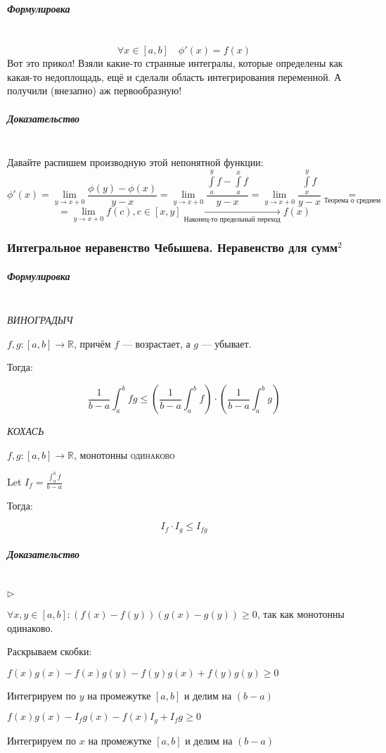 \documentclass{article}
\let\vanillasubparagraph\subparagraph
\renewcommand{\subparagraph}[1]{\vanillasubparagraph{#1}\mbox{}\\}
\begin{document}
\subparagraph{Формулировка}
$$
\forall x\in [a, b] \quad \phi'(x) = f(x)
$$
Вот это прикол! Взяли какие-то странные интегралы, которые определены как какая-то недоплощадь, ещё и сделали область интегрирования переменной. А получили (внезапно) аж первообразную! 

\subparagraph{Доказательство}

Давайте распишем производную этой непонятной функции:
$$
\phi'(x) = \lim_{y\rightarrow x+0}\frac{\phi(y)-\phi(x)}{y-x} = \lim_{y\rightarrow x+0}\frac{\int\limits_a^y f - \int\limits_a^x f}{y-x} = \lim_{y\rightarrow x+0}\frac{\int\limits_x^y f}{y-x} \underset{\text{Теорема о среднем}}{=}
$$
$$
=\lim_{y\rightarrow x+0}f(c), c \in [x, y] \underset{\text{Наконец-то предельный переход}}{\longrightarrow} f(x)
$$

\subsubsection{Интегральное неравенство Чебышева. Неравенство для сумм\texorpdfstring{$^2$}{}}

\subparagraph{Формулировка}

\textit{ВИНОГРАДЫЧ}

$f, g : \left[a, b\right] \rightarrow \mathbb{R}$, причём $f$ --- возрастает, а $g$ --- убывает.

Тогда:

\[\frac{1}{b - a}\int_a^b{fg} \le \left(\frac{1}{b - a} \int_a^bf\right) \cdot \left(\frac{1}{b - a} \int_a^bg\right)\]


\textit{КОХАСЬ}

$f, g : \left[a, b\right] \rightarrow \mathbb{R}$, монотонны \textsc{одинаково}

Let $I_f = \frac{\int_a^b{f}}{b - a}$

Тогда:

\[ I_f \cdot I_g \le I_{fg}\]


\subparagraph{Доказательство}
$\rhd$

$\forall x, y \in [a, b] : \left(f(x) - f(y)\right)\left(g(x) - g(y)\right) \ge 0$, так как монотонны одинаково. 

Раскрываем скобки:

$f(x)g(x) - f(x)g(y) - f(y)g(x) + f(y)g(y) \ge 0$

Интегрируем по $y$ на промежутке $[a, b]$ и делим на $(b - a)$ 

$f(x)g(x) - I_fg(x) - f(x)I_g + I_fg \ge 0$

Интегрируем по $x$ на промежутке $[a, b]$ и делим на $(b - a)$
\end{document}
